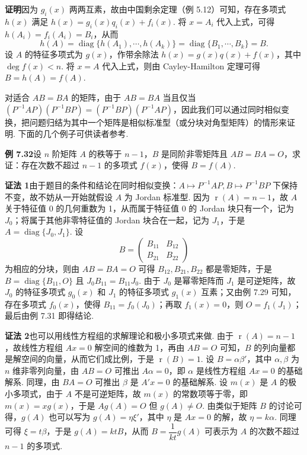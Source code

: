 \documentclass[UTF8, 12pt, fontset=fandol, oneside]{ctexart}
\begin{document}
\noindent\textbf{证明}\quad 因为 $g_i(x)$ 两两互素，故由中国剩余定理（例 5.12）可知，存在多项式 $h(x)$ 满足 $h(x)=g_i(x)q_i(x)+f_i(x)$. 将 $x=A_i$ 代入上式，可得 $h(A_i)=f_i(A_i)=B_i$，从而
\[
h(A)=\operatorname{diag}\{h(A_1),\cdots,h(A_k)\}
=\operatorname{diag}\{B_1,\cdots,B_k\}=B.
\]
设 $A$ 的特征多项式为 $g(x)$，作带余除法 $h(x)=g(x)q(x)+f(x)$，其中 $\deg f(x)<n$. 将 $x=A$ 代入上式，则由 Cayley-Hamilton 定理可得 $B=h(A)=f(A)$.

对适合 $AB=BA$ 的矩阵，由于 $AB=BA$ 当且仅当 $(P^{-1}AP)(P^{-1}BP)=(P^{-1}BP)(P^{-1}AP)$，因此我们可以通过同时相似变换，把问题归结为其中一个矩阵是相似标准型（或分块对角型矩阵）的情形来证明. 下面的几个例子可供读者参考.

\noindent\textbf{例 7.32}\quad 设 $n$ 阶矩阵 $A$ 的秩等于 $n-1$，$B$ 是同阶非零矩阵且 $AB=BA=O$，求证：存在次数不超过 $n-1$ 的多项式 $f(x)$，使得 $B=f(A)$.

\noindent\textbf{证法 1}\quad 由于题目的条件和结论在同时相似变换：$A\mapsto P^{-1}AP,B\mapsto P^{-1}BP$ 下保持不变，故不妨从一开始就假设 $A$ 为 Jordan 标准型. 因为 $\operatorname{r}(A)=n-1$，故 $A$ 关于特征值 0 的几何重数为 1，从而属于特征值 0 的 Jordan 块只有一个，记为 $J_0$；将属于其他非零特征值的 Jordan 块合在一起，记为 $J_1$，于是 $A=\operatorname{diag}\{J_0,J_1\}$. 设
\[
B=\left(\begin{array}{cc}
B_{11} & B_{12}\\
B_{21} & B_{22}
\end{array}\right)
\]
为相应的分块，则由 $AB=BA=O$ 可得 $B_{12},B_{21},B_{22}$ 都是零矩阵，于是 $B=\operatorname{diag}\{B_{11},O\}$ 且 $J_0B_{11}=B_{11}J_0$. 由于 $J_0$ 是幂零矩阵而 $J_1$ 是可逆矩阵，故 $J_0$ 的特征多项式 $g_0(x)$ 和 $J_1$ 的特征多项式 $g_1(x)$ 互素；又由例 7.29 可知，存在多项式 $f_0(x)$，使得 $B_{11}=f_0(J_0)$；再取 $f_1(x)=0$，则 $O=f_1(J_1)$；最后由例 7.31 即得结论.

\noindent\textbf{证法 2}\quad 也可以用线性方程组的求解理论和极小多项式来做. 由于 $\operatorname{r}(A)=n-1$，故线性方程组 $Ax=0$ 解空间的维数为 1，再由 $AB=O$ 可知，$B$ 的列向量都是解空间的向量，从而它们成比例，于是 $\operatorname{r}(B)=1$. 设 $B=\alpha\beta'$，其中 $\alpha,\beta$ 为 $n$ 维非零列向量，由 $AB=O$ 可推出 $A\alpha=0$，即 $\alpha$ 是线性方程组 $Ax=0$ 的基础解系. 同理，由 $BA=O$ 可推出 $\beta$ 是 $A'x=0$ 的基础解系. 设 $m(x)$ 是 $A$ 的极小多项式，由于 $A$ 不是可逆矩阵，故 $m(x)$ 的常数项等于零，即 $m(x)=xg(x)$，于是 $Ag(A)=O$ 但 $g(A)\ne O$. 由类似于矩阵 $B$ 的讨论可得，$g(A)$ 也可以写为 $g(A)=\eta\xi'$，其中 $\eta$ 是 $Ax=0$ 的解，故 $\eta=k\alpha$. 同理可得 $\xi=t\beta$，于是 $g(A)=ktB$，从而 $B=\dfrac{1}{kt}g(A)$ 可表示为 $A$ 的次数不超过 $n-1$ 的多项式.
\end{document}

